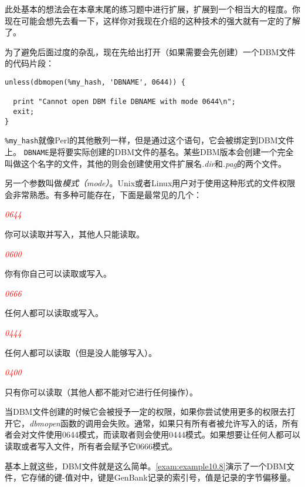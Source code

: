 此处基本的想法会在本章末尾的练习题中进行扩展，扩展到一个相当大的程度。你现在可能会想先去看一下，这样你对我现在介绍的这种技术的强大就有一定的了解了。

为了避免后面过度的杂乱，现在先给出打开（如果需要会先创建）一个DBM文件的代码片段：

\begin{lstlisting}
unless(dbmopen(%my_hash, 'DBNAME', 0644)) {
  
  print "Cannot open DBM file DBNAME with mode 0644\n";
  exit;
}
\end{lstlisting}

 \verb|%my_hash|就像Perl的其他散列一样，但是通过这个语句，它会被绑定到DBM文件上。 \verb|DBNAME|是将要实际创建的DBM文件的基名。某些DBM版本会创建一个完全叫做这个名字的文件，其他的则会创建使用文件扩展名\textit{.dir}和\textit{.pag}的两个文件。

另一个参数叫做\textit{模式（mode）}。Unix或者Linux用户对于使用这种形式的文件权限会非常熟悉。有多种可能存在，下面是最常见的几个：

\textcolor{red}{\textit{0644}}
\begin{adjustwidth}{4em}{}
你可以读取并写入，其他人只能读取。
\end{adjustwidth}

\textcolor{red}{\textit{0600}}
\begin{adjustwidth}{4em}{}
你有你自己可以读取或写入。
\end{adjustwidth}

\textcolor{red}{\textit{0666}}
\begin{adjustwidth}{4em}{}
任何人都可以读取或写入。
\end{adjustwidth}

\textcolor{red}{\textit{0444}}
\begin{adjustwidth}{4em}{}
任何人都可以读取（但是没人能够写入）。
\end{adjustwidth}

\textcolor{red}{\textit{0400}}
\begin{adjustwidth}{4em}{}
只有你可以读取（其他人都不能对它进行任何操作）。
\end{adjustwidth}

当DBM文件创建的时候它会被授予一定的权限，如果你尝试使用更多的权限去打开它，\textit{dbmopen}函数的调用会失败。通常，如果只有所有者被允许写入的话，所有者会对文件使用0644模式，而读取者则会使用0444模式。如果想要让任何人都可以读取或者写入文件，所有者会赋予它0666模式。

基本上就这些，DBM文件就是这么简单。\autoref{exam:example10.8}演示了一个DBM文件，它存储的键-值对中，键是GenBank记录的索引号，值是记录的字节偏移量。

